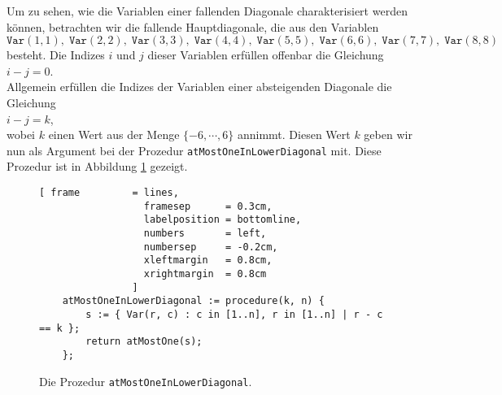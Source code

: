Um zu sehen, wie die Variablen einer fallenden Diagonale
charakterisiert werden k\"{o}nnen, betrachten wir die fallende Hauptdiagonale, die aus den
Variablen \\[0.2cm]
\hspace*{1.3cm} 
$\texttt{Var}(1,1),\; \texttt{Var}(2,2),\; \texttt{Var}(3,3),\; \texttt{Var}(4,4),\; \texttt{Var}(5,5),\; 
 \texttt{Var}(6,6),\; \texttt{Var}(7,7),\; \texttt{Var}(8,8)$ 
\\[0.2cm]
besteht. Die Indizes  $i$ und $j$ dieser Variablen erf\"{u}llen offenbar
die Gleichung \\[0.2cm]
\hspace*{1.3cm} $i - j = 0$. \\[0.2cm]
Allgemein erf\"{u}llen die Indizes der Variablen einer absteigenden Diagonale die Gleichung \\[0.2cm]
\hspace*{1.3cm} $i - j = k$, \\[0.2cm]
wobei $k$ einen Wert aus der Menge $\{-6, \cdots, 6 \}$ annimmt.  Diesen Wert $k$ geben
wir nun als Argument bei der Prozedur \texttt{atMostOneInLowerDiagonal} mit.
Diese Prozedur ist in Abbildung \ref{fig:atMostOneInLowerDiagonal} gezeigt.

\begin{figure}[!ht]
  \centering
\begin{Verbatim}[ frame         = lines, 
                  framesep      = 0.3cm, 
                  labelposition = bottomline,
                  numbers       = left,
                  numbersep     = -0.2cm,
                  xleftmargin   = 0.8cm,
                  xrightmargin  = 0.8cm
                ]
    atMostOneInLowerDiagonal := procedure(k, n) {
        s := { Var(r, c) : c in [1..n], r in [1..n] | r - c == k };
        return atMostOne(s);
    };
\end{Verbatim}
\vspace*{-0.3cm}
  \caption{Die Prozedur \texttt{atMostOneInLowerDiagonal}.}
  \label{fig:atMostOneInLowerDiagonal}
\end{figure}

